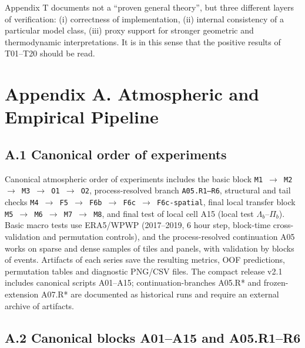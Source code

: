 \documentclass[11pt,a4paper]{article}
\theoremstyle{definition}
\theoremstyle{plain}
\theoremstyle{remark}
\begin{document}
Appendix T documents not a ``proven general theory'', but three different layers of verification:
(i) correctness of implementation,
(ii) internal consistency of a particular model class,
(iii) proxy support for stronger geometric and thermodynamic interpretations.
It is in this sense that the positive results of T01--T20 should be read.

\newpage
{}
\section*{Appendix A. Atmospheric and Empirical Pipeline}
\label{sec:appendix:atmo}

\subsection*{A.1 Canonical order of experiments}

Canonical atmospheric order of experiments includes the basic block
\texttt{M1 $\rightarrow$ M2 $\rightarrow$ M3 $\rightarrow$ O1 $\rightarrow$ O2},
process-resolved branch \texttt{A05.R1--R6},
structural and tail checks \texttt{M4 $\rightarrow$ F5 $\rightarrow$ F6b $\rightarrow$ F6c $\rightarrow$ F6c-spatial},
final local transfer block \texttt{M5 $\rightarrow$ M6 $\rightarrow$ M7 $\rightarrow$ M8},
and final test of local cell A15 (local test $\Lambda_b$--$\Pi_b$).
Basic macro tests use ERA5/WPWP (2017--2019, 6 hour step, block-time cross-validation and permutation controls),
and the process-resolved continuation A05 works on sparse and dense samples of tiles and panels, with validation by blocks of events.
Artifacts of each series save the resulting metrics, OOF predictions, permutation tables and diagnostic PNG/CSV files.
The compact release v2.1 includes canonical scripts A01--A15; continuation-branches A05.R* and frozen-extension A07.R* are documented as historical runs and require an external archive of artifacts.

\subsection*{A.2 Canonical blocks A01--A15 and A05.R1--R6}
\end{document}
